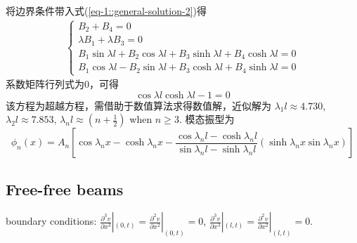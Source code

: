 将边界条件带入式(\ref{eq-1::general-solution-2})得
\begin{equation}
    \begin{aligned}
        \left\{\begin{array}{l}
            B_{2} + B_{4} = 0\\
            \lambda B_{1} + \lambda B_{3} = 0\\
            B_{1}\sin \lambda l + B_{2}\cos \lambda l + B_{3}\sinh \lambda l + B_{4}\cosh \lambda l= 0\\
            B_{1}\cos \lambda l - B_{2}\sin \lambda l + B_{3}\cosh \lambda l + B_{4}\sinh \lambda l= 0
        \end{array}\right.
    \end{aligned}
\end{equation}
系数矩阵行列式为0，可得
\begin{equation}\label{eq-1::fixed-fixed}
    \cos \lambda l \cosh \lambda l - 1=0
\end{equation}
该方程为超越方程，需借助于数值算法求得数值解，近似解为
$\lambda_{1}l\approx 4.730$, $\lambda_{2}l\approx 7.853$,  
$\lambda_{n}l\approx \left(n + \frac{1}{2}\right)$ when $n\ge 3$.
模态振型为
\begin{equation}
    \phi_{n}(x)=A_{n}\left[\cos\lambda_{n}x - \cosh\lambda_{n}x - 
    \frac{\cos\lambda_{n}l - \cosh\lambda_{n}l}{\sin\lambda_{n}l - \sinh\lambda_{n}l}
    \left(\sinh\lambda_{n}x \sin\lambda_{n}x\right)\right]    
\end{equation}

\subsection{Free-free beams}

boundary conditions: $\frac{\partial^{3} v}{\partial x^{3}}|_{(0,t)}=\frac{\partial^{2} v}{\partial x^{2}}|_{(0,t)}=0$, 
$\frac{\partial^{3} v}{\partial x^{3}}|_{(l,t)}=\frac{\partial^{2} v}{\partial x^{2}}|_{(l,t)}=0$. 

